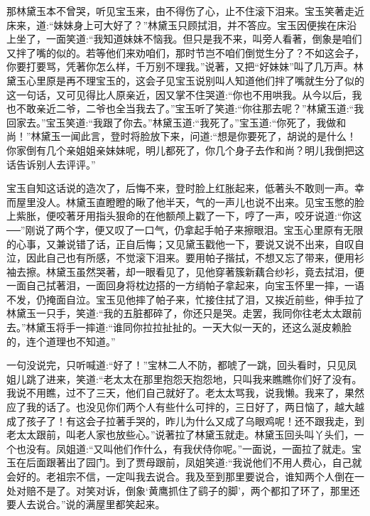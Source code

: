 \begin{parag}
    那林黛玉本不曾哭，听见宝玉来，由不得伤了心，止不住滚下泪来。宝玉笑著走近床来，道:“妹妹身上可大好了？”林黛玉只顾拭泪，并不答应。宝玉因便挨在床沿上坐了，一面笑道:“我知道妹妹不恼我。但只是我不来，叫旁人看著，倒象是咱们又拌了嘴的似的。若等他们来劝咱们，那时节岂不咱们倒觉生分了？不如这会子，你要打要骂，凭著你怎么样，千万别不理我。”说著，又把“好妹妹”叫了几万声。林黛玉心里原是再不理宝玉的，这会子见宝玉说别叫人知道他们拌了嘴就生分了似的这一句话，又可见得比人原亲近，因又掌不住哭道:“你也不用哄我。从今以后，我也不敢亲近二爷，二爷也全当我去了。”宝玉听了笑道:“你往那去呢？”林黛玉道:“我回家去。”宝玉笑道:“我跟了你去。”林黛玉道:“我死了。”宝玉道:“你死了，我做和尚！”林黛玉一闻此言，登时将脸放下来，问道:“想是你要死了，胡说的是什么！你家倒有几个亲姐姐亲妹妹呢，明儿都死了，你几个身子去作和尚？明儿我倒把这话告诉别人去评评。”
\end{parag}


\begin{parag}
    宝玉自知这话说的造次了，后悔不来，登时脸上红胀起来，低著头不敢则一声。幸而屋里没人。林黛玉直瞪瞪的瞅了他半天，气的一声儿也说不出来。见宝玉憋的脸上紫胀，便咬著牙用指头狠命的在他额颅上戳了一下，哼了一声，咬牙说道:“你这──”刚说了两个字，便又叹了一口气，仍拿起手帕子来擦眼泪。宝玉心里原有无限的心事，又兼说错了话，正自后悔；又见黛玉戳他一下，要说又说不出来，自叹自泣，因此自己也有所感，不觉滚下泪来。要用帕子揩拭，不想又忘了带来，便用衫袖去擦。林黛玉虽然哭著，却一眼看见了，见他穿著簇新藕合纱衫，竟去拭泪，便一面自己拭著泪，一面回身将枕边搭的一方绡帕子拿起来，向宝玉怀里一摔，一语不发，仍掩面自泣。宝玉见他摔了帕子来，忙接住拭了泪，又挨近前些，伸手拉了林黛玉一只手，笑道:“我的五脏都碎了，你还只是哭。走罢，我同你往老太太跟前去。”林黛玉将手一摔道:“谁同你拉拉扯扯的。一天大似一天的，还这么涎皮赖脸的，连个道理也不知道。”
\end{parag}


\begin{parag}
    一句没说完，只听喊道:“好了！”宝林二人不防，都唬了一跳，回头看时，只见凤姐儿跳了进来，笑道:“老太太在那里抱怨天抱怨地，只叫我来瞧瞧你们好了没有。我说不用瞧，过不了三天，他们自己就好了。老太太骂我，说我懒。我来了，果然应了我的话了。也没见你们两个人有些什么可拌的，三日好了，两日恼了，越大越成了孩子了！有这会子拉著手哭的，昨儿为什么又成了乌眼鸡呢！还不跟我走，到老太太跟前，叫老人家也放些心。”说著拉了林黛玉就走。林黛玉回头叫丫头们，一个也没有。凤姐道:“又叫他们作什么，有我伏侍你呢。”一面说，一面拉了就走。宝玉在后面跟著出了园门。到了贾母跟前，凤姐笑道:“我说他们不用人费心，自己就会好的。老祖宗不信，一定叫我去说合。我及至到那里要说合，谁知两个人倒在一处对赔不是了。对笑对诉，倒象‘黄鹰抓住了鹞子的脚’，两个都扣了环了，那里还要人去说合。”说的满屋里都笑起来。
\end{parag}


